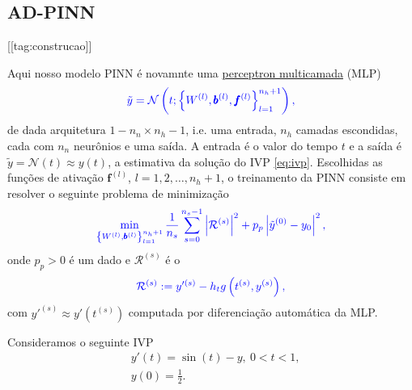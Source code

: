 \subsection{AD-PINN}
[[tag:construcao]]

Aqui nosso modelo PINN é novamnte uma \href{https://notaspedrok.com.br/notas/RedesNeuraisArtificiais/cap_mlp_sec_modelo.html}{perceptron multicamada} (MLP)
\begin{equation}\color{blue}\tilde{y} = \mathcal{N}\left(t; \left\{W^{(l)}, \pmb{b}^{(l)}, \pmb{f}^{(l)}\right\}_{l=1}^{n_h+1}\right),
\end{equation}
de dada arquitetura $1 - n_n\times n_h - 1$, i.e. uma entrada, $n_h$ camadas escondidas, cada com $n_n$ neurônios e uma saída. A entrada é o valor do tempo $t$ e a saída é $\tilde{y} = \mathcal{N}(t) \approx y(t)$, a estimativa da solução do IVP \eqref{eq:ivp}. Escolhidas as funções de ativação $\pmb{f}^{(l)}$, $l = 1, 2, \dotsc, n_h+1$, o treinamento da PINN consiste em resolver o seguinte problema de minimização
\begin{equation}\color{blue}\min_{\left\{W^{(l)}, \pmb{b}^{(l)}\right\}_{l=1}^{n_h+1}} \frac{1}{n_s}\sum_{s=0}^{n_s-1}\left|\mathcal{R}^{(s)}\right|^2 + p_p\left|\tilde{y}^{(0)} - y_0\right|^2,
\end{equation}
onde $p_p>0$ é um dado  e $\mathcal{R}^{(s)}$ é o 
\begin{equation}\color{blue}\mathcal{R}^{(s)} := y'^{(s)} - h_tg\left(t^{(s)}, y^{(s)}\right),
\end{equation}
com $y'^{(s)} \approx y'\left(t^{(s)}\right)$ computada por diferenciação automática da MLP.

\begin{ex}
  Consideramos o seguinte IVP
  \begin{subequations}
    \begin{align}
      &y'(t) = \sin(t) - y, ~0 < t < 1,\\
      &y(0) = \frac{1}{2}.
    \end{align}
  \end{subequations}
\end{ex}

